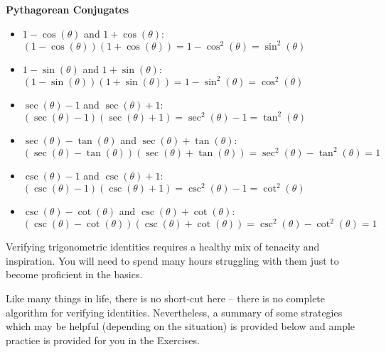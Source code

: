 \label{PythagoreanConjugates}
\smallskip
\colorbox{ResultColor}{\bbm

\smallskip

\centerline{\textbf{Pythagorean Conjugates}}  

\begin{itemize}

\item $1 - \cos(\theta)$ and  $1+\cos(\theta)$:  $(1-\cos(\theta))(1+\cos(\theta)) = 1 - \cos^{2}(\theta) = \sin^{2}(\theta)$

\item  $1-\sin(\theta)$ and $1 + \sin(\theta)$:  $(1-\sin(\theta))(1+\sin(\theta)) = 1 - \sin^{2}(\theta) = \cos^{2}(\theta)$

\item  $\sec(\theta)-1$ and $\sec(\theta)+1$:  $(\sec(\theta)-1)(\sec(\theta)+1) = \sec^{2}(\theta) - 1 =  \tan^{2}(\theta)$

\item  $\sec(\theta)-\tan(\theta)$ and $\sec(\theta)+\tan(\theta)$:  $(\sec(\theta)-\tan(\theta))(\sec(\theta)+\tan(\theta)) = \sec^{2}(\theta) - \tan^{2}(\theta) = 1$

\item  $\csc(\theta)-1$ and $\csc(\theta)+1$:  $(\csc(\theta)-1)(\csc(\theta)+1) = \csc^{2}(\theta) - 1 =  \cot^{2}(\theta)$

\item  $\csc(\theta)-\cot(\theta)$ and $\csc(\theta)+\cot(\theta)$:  $(\csc(\theta)-\cot(\theta))(\csc(\theta)+\cot(\theta)) = \csc^{2}(\theta) - \cot^{2}(\theta) = 1$

\smallskip

\end{itemize}

\ebm}


\smallskip

Verifying trigonometric identities requires a healthy mix of tenacity and inspiration.  You will need to spend many hours struggling with them just to become proficient in the basics. 

\smallskip

 Like many things in life, there is no short-cut here -- there is no complete algorithm for verifying identities.  Nevertheless, a summary of some strategies which  may be helpful (depending on the situation) is provided below and ample practice is provided for you in the Exercises.
 
 \smallskip

